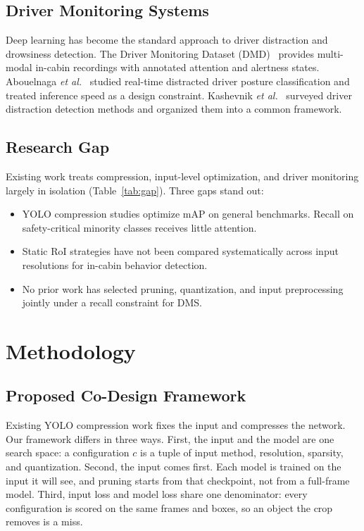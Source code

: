 \documentclass[conference]{IEEEtran}
\begin{document}
\subsection{Driver Monitoring Systems}
Deep learning has become the standard approach to driver distraction and drowsiness detection. The Driver Monitoring Dataset (DMD)~\cite{b20} provides multi-modal in-cabin recordings with annotated attention and alertness states. Abouelnaga \emph{et al.}~\cite{b21} studied real-time distracted driver posture classification and treated inference speed as a design constraint. Kashevnik \emph{et al.}~\cite{b22} surveyed driver distraction detection methods and organized them into a common framework.

\subsection{Research Gap}
Existing work treats compression, input-level optimization, and driver monitoring largely in isolation (Table~\ref{tab:gap}). Three gaps stand out:
\begin{itemize}
    \item YOLO compression studies optimize mAP on general benchmarks. Recall on safety-critical minority classes receives little attention.
    \item Static RoI strategies have not been compared systematically across input resolutions for in-cabin behavior detection.
    \item No prior work has selected pruning, quantization, and input preprocessing jointly under a recall constraint for DMS.
\end{itemize}



\section{Methodology}

\subsection{Proposed Co-Design Framework}
\label{sec:framework}
Existing YOLO compression work fixes the input and compresses the network. Our framework differs in three ways. First, the input and the model are one search space: a configuration $c$ is a tuple of input method, resolution, sparsity, and quantization. Second, the input comes first. Each model is trained on the input it will see, and pruning starts from that checkpoint, not from a full-frame model. Third, input loss and model loss share one denominator: every configuration is scored on the same frames and boxes, so an object the crop removes is a miss.
\end{document}
